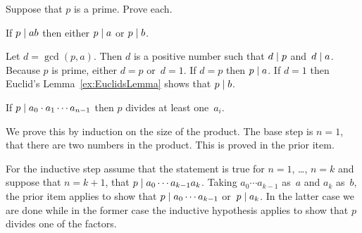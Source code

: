 \documentclass{test}  %
\begin{document}
\begin{problem} 
Suppose that $p$ is a prime.  Prove each.\label{ex:EuclidsOtherLemma}
\begin{exes}
\begin{exercise} 
  If  $p\mid ab$ then either $p\mid a$ or $p\mid b$.
\end{exercise}
\begin{answer}
  Let $d=\gcd(p,a)$.
  Then $d$ is a positive number such that $d\mid p$ and~$d\mid a$.
  Because $p$ is prime, either $d=p$ or~$d=1$.
  If $d=p$ then $p\mid a$.
  If $d=1$ then Euclid's Lemma~\ref{ex:EuclidsLemma} shows that 
  $p\mid b$.
\end{answer}
\begin{exercise} 
  If $p\mid a_0\cdot a_1\cdots a_{n-1}$ then $p$ divides at least one~$a_i$.
\end{exercise}
\begin{answer}
  We prove this by induction on the size of the product.
  The base step is $n=1$, that there are two numbers in the product.
  This is proved in the prior item.

  For the inductive step assume that the statement is true for $n=1$, \ldots,
  $n=k$ and suppose that $n=k+1$, that $p\mid a_0\cdots a_{k-1}a_k$.
  Taking $a_0\cdots a_{k-1}$ as~$a$ and $a_k$ as~$b$, the prior item applies
  to show that $p\mid a_0\cdots a_{k-1}$ or~$p\mid a_k$.
  In the latter case we are done while in the former case the
  inductive hypothesis applies to show that $p$ divides one of the factors.  
\end{answer}
\end{exes}

\end{problem}
\end{document}
